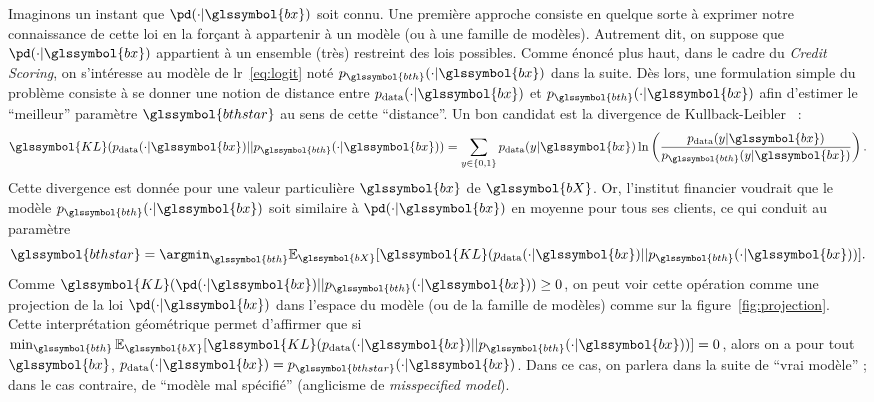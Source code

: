 Imaginons un instant que $\pd(\cdot | \glssymbol{bx})$ soit connu. Une première approche consiste en quelque sorte à exprimer notre connaissance de cette loi en la forçant à appartenir à un modèle (ou à une famille de modèles). Autrement dit, on suppose que $\pd(\cdot | \glssymbol{bx})$ appartient à un ensemble (très) restreint des lois possibles. 
Comme énoncé plus haut, dans le cadre du \textit{Credit Scoring}, on s'intéresse au modèle de \gls{lr}~\eqref{eq:logit} noté $p_{\glssymbol{bth}}(\cdot | \glssymbol{bx})$ dans la suite. Dès lors, une formulation simple du problème consiste à se donner une notion de distance entre $p_{\text{data}}(\cdot | \glssymbol{bx})$ et $p_{\glssymbol{bth}}(\cdot | \glssymbol{bx})$ afin d'estimer le ``meilleur'' paramètre $\glssymbol{bthstar}$ au sens de cette ``distance''. Un bon candidat est la divergence de Kullback-Leibler~\cite{kullback1951information} :
\begin{equation} \label{eq:KL}
\glssymbol{KL}(p_{\text{data}}(\cdot | \glssymbol{bx})||p_{\glssymbol{bth}}(\cdot | \glssymbol{bx})) = \sum_{y \in \{0,1\}} p_{\text{data}}(y | \glssymbol{bx}) \ln \left( \frac{p_{\text{data}}(y | \glssymbol{bx})}{p_{\glssymbol{bth}}(y | \glssymbol{bx})} \right).
\end{equation}
Cette divergence est donnée pour une valeur particulière $\glssymbol{bx}$ de $\glssymbol{bX}$. Or, l'institut financier voudrait que le modèle $p_{\glssymbol{bth}}(\cdot | \glssymbol{bx})$ soit similaire à $\pd(\cdot | \glssymbol{bx})$ en moyenne pour tous ses clients, ce qui conduit au paramètre $${\glssymbol{bthstar}} = \argmin_{\glssymbol{bth}} \mathbb{E}_{\glssymbol{bX}} [\glssymbol{KL}(p_{\text{data}}(\cdot | \glssymbol{bx})||p_{\glssymbol{bth}}(\cdot | \glssymbol{bx}))].$$ Comme $\glssymbol{KL}(\pd(\cdot | \glssymbol{bx})||p_{\glssymbol{bth}}(\cdot | \glssymbol{bx})) \geq 0$, on peut voir cette opération comme une projection de la loi $\pd(\cdot | \glssymbol{bx})$ dans l'espace du modèle (ou de la famille de modèles) comme sur la figure~\ref{fig:projection}. Cette interprétation géométrique permet d'affirmer que si $\min_{\glssymbol{bth}} \mathbb{E}_{\glssymbol{bX}} [\glssymbol{KL}(p_{\text{data}}(\cdot | \glssymbol{bx})||p_{\glssymbol{bth}}(\cdot | \glssymbol{bx}))] = 0$, alors on a pour tout $\glssymbol{bx}$, $p_{\text{data}}(\cdot | \glssymbol{bx}) = p_{\glssymbol{bthstar}}(\cdot | \glssymbol{bx})$. Dans ce cas, on parlera dans la suite de ``vrai modèle'' ; dans le cas contraire, de ``modèle mal spécifié'' (anglicisme de \textit{misspecified model}).

